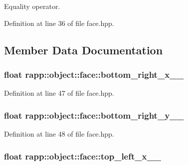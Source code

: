 Equality operator. 



Definition at line 36 of file face.\-hpp.



\subsection{Member Data Documentation}
\hypertarget{classrapp_1_1object_1_1face_afc08b0adb766ef20c60bcd8c21d07852}{
\subsubsection[{bottom\-\_\-right\-\_\-x\-\_\-\-\_\-}]{\setlength{\rightskip}{0pt plus 5cm}float rapp\-::object\-::face\-::bottom\-\_\-right\-\_\-x\-\_\-\-\_\-\hspace{0.3cm}{\ttfamily [private]}}}\label{classrapp_1_1object_1_1face_afc08b0adb766ef20c60bcd8c21d07852}


Definition at line 47 of file face.\-hpp.

\hypertarget{classrapp_1_1object_1_1face_a228058127dbd3077c97edbed509865b8}{
\subsubsection[{bottom\-\_\-right\-\_\-y\-\_\-\-\_\-}]{\setlength{\rightskip}{0pt plus 5cm}float rapp\-::object\-::face\-::bottom\-\_\-right\-\_\-y\-\_\-\-\_\-\hspace{0.3cm}{\ttfamily [private]}}}\label{classrapp_1_1object_1_1face_a228058127dbd3077c97edbed509865b8}


Definition at line 48 of file face.\-hpp.

\hypertarget{classrapp_1_1object_1_1face_a9d04cd084b62af674516aa71b8c8a142}{
\subsubsection[{top\-\_\-left\-\_\-x\-\_\-\-\_\-}]{\setlength{\rightskip}{0pt plus 5cm}float rapp\-::object\-::face\-::top\-\_\-left\-\_\-x\-\_\-\-\_\-\hspace{0.3cm}{\ttfamily [private]}}}\label{classrapp_1_1object_1_1face_a9d04cd084b62af674516aa71b8c8a142}


